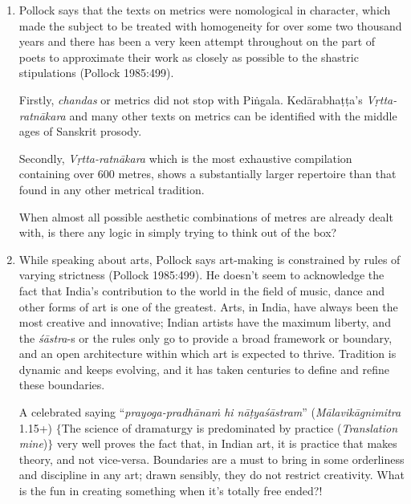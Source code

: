 \begin{enumerate}
\item Pollock says that the texts on metrics were nomological in character, which made the subject to be treated with homogeneity for over some two thousand years and there has been a very keen attempt throughout on the part of poets to approximate their work as closely as possible to the shastric stipulations (Pollock 1985:499). 

Firstly, {\it chandas} or metrics did not stop with Piṅgala. Kedārabhaṭṭa's \textsl{Vṛtta-ratnākara} and many other texts on metrics can be identified with the middle ages of Sanskrit prosody. 

Secondly, {\it Vṛtta-ratnākara} which is the most exhaustive compilation containing over 600 metres,  shows a substantially larger repertoire than that found in any other metrical tradition. 

When almost all possible aesthetic combinations of metres are already dealt with, is there any logic in simply trying to think out of the box?  

\item While speaking about arts, Pollock says art-making is constrained by rules of varying strictness (Pollock 1985:499). He doesn't seem to acknowledge the fact that India's contribution to the world in the field of music, dance and other forms of art is one of the greatest. Arts, in India, have always been the most creative and innovative; Indian artists have the maximum liberty, and the {\it śāstra}-s or the rules only go to provide a broad framework or boundary, and an open architecture within which art is expected to thrive. Tradition is dynamic and keeps evolving, and it has taken centuries to define and refine these boundaries. 

A celebrated saying ``\textsl{prayoga-pradhānaṁ hi nāṭyaśāstram}'' ({\it Māla\-vikāgnimitra} 1.15+) $\{$The science of dramaturgy is predominated by practice (\textsl{Translation mine})$\}$ very well proves the fact that, in Indian art, it is practice that makes theory, and not vice-versa. Boundaries are a must to bring in some orderliness and discipline in any art; drawn sensibly, they do not restrict creativity. What is the fun in creating something when it's totally free ended?! 


\end{enumerate}
